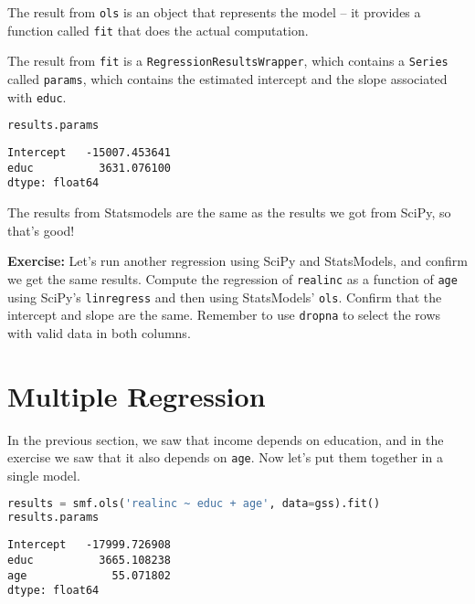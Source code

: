 The result from \passthrough{\lstinline!ols!} is an object that
represents the model -- it provides a function called
\passthrough{\lstinline!fit!} that does the actual computation.

\pagebreak

The result from \passthrough{\lstinline!fit!} is a \passthrough{\lstinline!RegressionResultsWrapper!},
which contains a \passthrough{\lstinline!Series!} called
\passthrough{\lstinline!params!}, which contains the estimated intercept
and the slope associated with \passthrough{\lstinline!educ!}.


\begin{lstlisting}[language=Python,style=source]
results.params
\end{lstlisting}

\begin{lstlisting}[style=output]
Intercept   -15007.453641
educ          3631.076100
dtype: float64
\end{lstlisting}

The results from Statsmodels are the same as the results we got from
SciPy, so that's good!

\textbf{Exercise:} Let's run another regression using SciPy and
StatsModels, and confirm we get the same results. Compute the regression
of \passthrough{\lstinline!realinc!} as a function of
\passthrough{\lstinline!age!} using SciPy's
\passthrough{\lstinline!linregress!} and then using StatsModels'
\passthrough{\lstinline!ols!}. Confirm that the intercept and slope are
the same. Remember to use \passthrough{\lstinline!dropna!} to select the
rows with valid data in both columns.

\section{Multiple Regression}\label{multiple-regression}

In the previous section, we saw that income depends on education, and in
the exercise we saw that it also depends on
\passthrough{\lstinline!age!}. Now let's put them together in a single
model.


\begin{lstlisting}[language=Python,style=source]
results = smf.ols('realinc ~ educ + age', data=gss).fit()
results.params
\end{lstlisting}

\begin{lstlisting}[style=output]
Intercept   -17999.726908
educ          3665.108238
age             55.071802
dtype: float64
\end{lstlisting}


